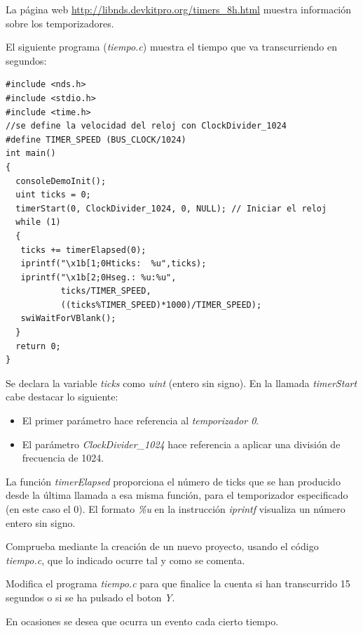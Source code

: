 La página web \url{http://libnds.devkitpro.org/timers_8h.html} muestra información sobre los temporizadores.

\begin{example}
El siguiente programa (\textit{tiempo.c}) muestra el tiempo que va transcurriendo en segundos:
\begin{lstlisting}
#include <nds.h>
#include <stdio.h>
#include <time.h>
//se define la velocidad del reloj con ClockDivider_1024
#define TIMER_SPEED (BUS_CLOCK/1024)
int main()
{
  consoleDemoInit();
  uint ticks = 0;
  timerStart(0, ClockDivider_1024, 0, NULL); // Iniciar el reloj
  while (1)
  {
   ticks += timerElapsed(0);  
   iprintf("\x1b[1;0Hticks:  %u",ticks);
   iprintf("\x1b[2;0Hseg.: %u:%u",
           ticks/TIMER_SPEED,
           ((ticks%TIMER_SPEED)*1000)/TIMER_SPEED);
   swiWaitForVBlank();
  }
  return 0;
}
\end{lstlisting}
\end{example}
	
Se declara la variable \textit{ticks} como \textit{uint} (entero sin signo). En la llamada \textit{timerStart} cabe destacar lo si\-guien\-te:
\begin{itemize}
\item El primer parámetro hace referencia al \textit{temporizador 0}.
%
\item El parámetro \textit{ClockDivider\_1024} hace referencia a aplicar una división de frecuencia de 1024.
\end{itemize}

La función \textit{timerElapsed} proporciona el número de ticks que se han producido desde la última llamada a esa misma función, para el temporizador especificado (en este caso el 0).  El formato \textit{\%u} en la instrucción \textit{iprintf}  visualiza un número entero sin signo.

\begin{exercise}
	Comprueba mediante la creación de un nuevo proyecto, usando el código \textit{tiempo.c}, que lo indicado ocurre tal y como se comenta.
\end{exercise}

\begin{exercise}
Modifica el programa \textit{tiempo.c} para que finalice la cuenta si han transcurrido 15 segundos o si se ha pulsado el boton \textit{Y}.
\end{exercise}

En ocasiones se desea que ocurra un evento cada cierto tiempo. 

